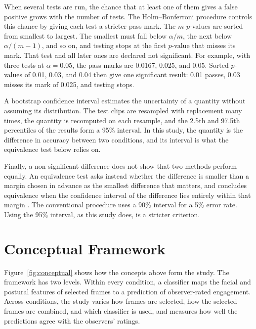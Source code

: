 When several tests are run, the chance that at least one of them gives a false positive grows with the number of tests. The Holm--Bonferroni procedure \cite{holm1979} controls this chance by giving each test a stricter pass mark. The $m$ $p$-values are sorted from smallest to largest. The smallest must fall below $\alpha / m$, the next below $\alpha / (m - 1)$, and so on, and testing stops at the first $p$-value that misses its mark. That test and all later ones are declared not significant. For example, with three tests at $\alpha = 0.05$, the pass marks are 0.0167, 0.025, and 0.05. Sorted $p$-values of 0.01, 0.03, and 0.04 then give one significant result: 0.01 passes, 0.03 misses its mark of 0.025, and testing stops.

A bootstrap confidence interval \cite{efron1993} estimates the uncertainty of a quantity without assuming its distribution. The test clips are resampled with replacement many times, the quantity is recomputed on each resample, and the 2.5th and 97.5th percentiles of the results form a 95\% interval. In this study, the quantity is the difference in accuracy between two conditions, and its interval is what the equivalence test below relies on.

Finally, a non-significant difference does not show that two methods perform equally. An equivalence test asks instead whether the difference is smaller than a margin chosen in advance as the smallest difference that matters, and concludes equivalence when the confidence interval of the difference lies entirely within that margin \cite{lakens2017}. The conventional procedure uses a 90\% interval for a 5\% error rate. Using the 95\% interval, as this study does, is a stricter criterion.



\section{Conceptual Framework}
\label{sec:conceptual}

Figure~\ref{fig:conceptual} shows how the concepts above form the study. The framework has two levels. Within every condition, a classifier maps the facial and postural features of selected frames to a prediction of observer-rated engagement. Across conditions, the study varies how frames are selected, how the selected frames are combined, and which classifier is used, and measures how well the predictions agree with the observers' ratings.

